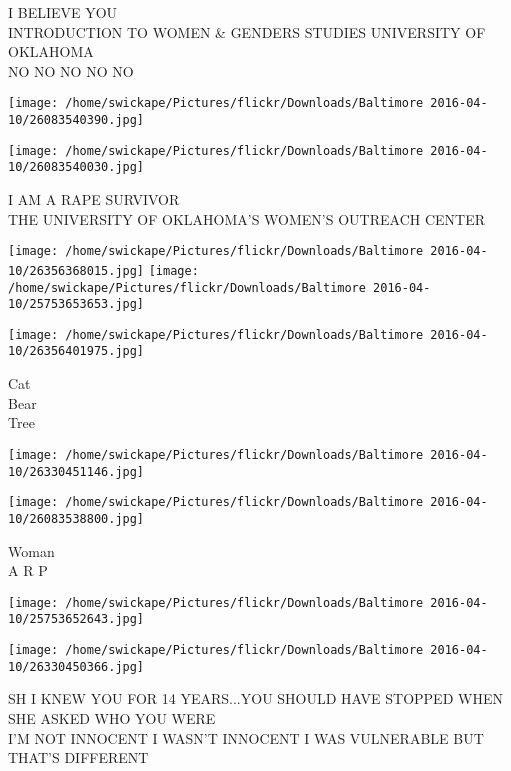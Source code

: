 \documentclass[10pt,letterpaper]{article}
\begin{document}
I BELIEVE YOU\\
INTRODUCTION TO WOMEN \& GENDERS STUDIES UNIVERSITY OF OKLAHOMA\\
NO NO NO NO NO\\
\pagebreak

\texttt{[image: /home/swickape/Pictures/flickr/Downloads/Baltimore 2016-04-10/26083540390.jpg]}

\vspace{0.25in}
\texttt{[image: /home/swickape/Pictures/flickr/Downloads/Baltimore 2016-04-10/26083540030.jpg]}

I AM A RAPE SURVIVOR\\
THE UNIVERSITY OF OKLAHOMA'S WOMEN'S OUTREACH CENTER\\
\pagebreak

\texttt{[image: /home/swickape/Pictures/flickr/Downloads/Baltimore 2016-04-10/26356368015.jpg]}
\texttt{[image: /home/swickape/Pictures/flickr/Downloads/Baltimore 2016-04-10/25753653653.jpg]}

\vspace{0.25in}
\texttt{[image: /home/swickape/Pictures/flickr/Downloads/Baltimore 2016-04-10/26356401975.jpg]}

Cat\\
Bear\\
Tree\\
\pagebreak

\texttt{[image: /home/swickape/Pictures/flickr/Downloads/Baltimore 2016-04-10/26330451146.jpg]}

\vspace{0.25in}
\texttt{[image: /home/swickape/Pictures/flickr/Downloads/Baltimore 2016-04-10/26083538800.jpg]}

Woman\\
A R P\\
\pagebreak

\texttt{[image: /home/swickape/Pictures/flickr/Downloads/Baltimore 2016-04-10/25753652643.jpg]}

\vspace{0.25in}
\texttt{[image: /home/swickape/Pictures/flickr/Downloads/Baltimore 2016-04-10/26330450366.jpg]}

SH I KNEW YOU FOR 14 YEARS...YOU SHOULD HAVE STOPPED WHEN SHE ASKED WHO YOU WERE\\
I'M NOT INNOCENT I WASN'T INNOCENT I WAS VULNERABLE BUT THAT'S DIFFERENT\\
\pagebreak
\end{document}
